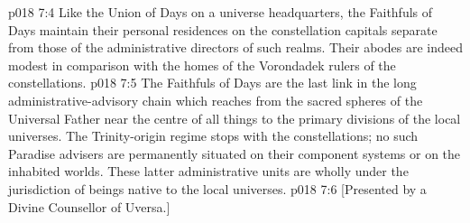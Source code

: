 \vs p018 7:4 Like the Union of Days on a universe headquarters, the Faithfuls of Days maintain their personal residences on the constellation capitals separate from those of the administrative directors of such realms. Their abodes are indeed modest in comparison with the homes of the Vorondadek rulers of the constellations.
\vs p018 7:5 The Faithfuls of Days are the last link in the long administrative\hyp{}advisory chain which reaches from the sacred spheres of the Universal Father near the centre of all things to the primary divisions of the local universes. The Trinity\hyp{}origin regime stops with the constellations; no such Paradise advisers are permanently situated on their component systems or on the inhabited worlds. These latter administrative units are wholly under the jurisdiction of beings native to the local universes.
\vsetoff
\vs p018 7:6 [Presented by a Divine Counsellor of Uversa.]
\quizlink
